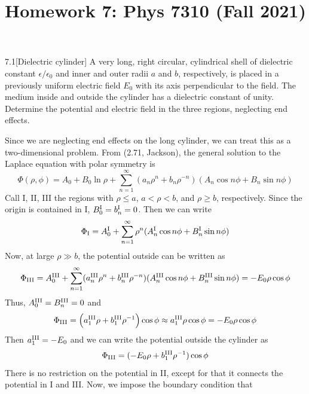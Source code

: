 \documentclass[12pt]{article}
\title{Homework 7: Phys 7310 (Fall 2021)}
\begin{document}
\maketitle
\begin{problem}{7.1}[Dielectric cylinder]
A very long, right circular, cylindrical shell of dielectric constant
$\epsilon /\epsilon_0$ and inner and outer radii $a$ and $b$, respectively, is
placed in a previously uniform electric field $E_0$ with its axis perpendicular
to the field. The medium inside and outside the cylinder has a dielectric
constant of unity. Determine the potential and electric field in the three
regions, neglecting end effects.
\begin{solution}
Since we are neglecting end effects on the long cylinder, we can treat this as a
two-dimensional problem. From (2.71, Jackson), the general solution to the 
Laplace equation with polar symmetry is
\begin{equation}
    \Phi(\rho,\phi)
    =A_0+B_0\ln\rho+\sum_{n=1}^\infty(a_n\rho^n+b_n\rho^{-n})(A_n\cos
    n\phi+B_n\sin n\phi) 
\end{equation}
Call \RN{1}, \RN{2}, \RN{3} the regions with $\rho\leq a$, $a<\rho<b$, 
and $\rho\geq b$, respectively. Since the origin is contained in \RN{1},
$B_0^{\RN{1}}=b_n^{\RN{1}}=0$. Then we can write
\begin{equation}
    \Phi_{\RN{1}}=A_0^{\RN{1}}+\sum_{n=1}^\infty\rho^n(A_n^{\RN{1}}\cos
    n\phi+B_n^{\RN{1}}\sin n\phi)
\end{equation}
Now, at large $\rho\gg b$, the potential outside can be written as
\begin{equation}
    \Phi_{\RN{3}}=A_0^{\RN{3}}+\sum_{n=1}^\infty(a_n^{\RN{3}}\rho^n+b_n^{\RN{3}}\rho^{-n})(A_n^{\RN{3}}\cos n\phi+B_n^{\RN{3}}\sin n\phi)
    =-E_0\rho\cos\phi
\end{equation}
Thus, $A_0^{\RN{3}}=B_n^{\RN{3}}=0$ and
\begin{equation}
    \Phi_{\RN{3}}=\qty(a_1^{\RN{3}}\rho+b_1^{\RN{3}}\rho^{-1})\cos\phi
    \approx a_1^{\RN{3}}\rho\cos\phi
    =-E_0\rho\cos\phi
\end{equation}
Then $a_1^{\RN{3}}=-E_0$ and we can write the potential outside the cylinder as
\begin{equation}
    \Phi_{\RN{3}}=(-E_0\rho+b_1^{\RN{3}}\rho^{-1})\cos\phi 
\end{equation}
There is no restriction on the potential in \RN{2}, except for that it connects
the potential in \RN{1} and \RN{3}. Now, we impose the boundary condition that

\end{solution}
\end{problem}
\end{document}
